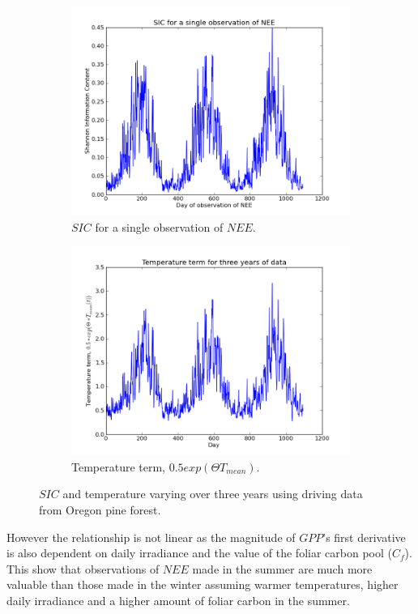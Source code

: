 \documentclass[11pt]{article}
\begin{document}
\begin{figure}
\centering
\begin{subfigure}{.5\textwidth}
  \centering
  \includegraphics[width=.9\linewidth]{SIC1Obs_0_1095.png}
  \caption{$SIC$ for a single observation of $NEE$.}
  \label{fig:sub1}
\end{subfigure}%
\begin{subfigure}{.5\textwidth}
  \centering
  \includegraphics[width=.9\linewidth]{Temp_0_1095.png}
  \caption{Temperature term, $0.5exp(\Theta T_{mean})$.}
  \label{fig:sub2}
\end{subfigure}
\caption{$SIC$ and temperature varying over three years using driving data from Oregon pine forest.}
\label{fig:SICNEET}
\end{figure}

However the relationship is not linear as the magnitude of $GPP$'s first derivative is also dependent on daily irradiance and the value of the foliar carbon pool ($C_f$). This show that observations of $NEE$ made in the summer are much more valuable than those made in the winter assuming warmer temperatures, higher daily irradiance and a higher amount of foliar carbon in the summer.
\end{document}
